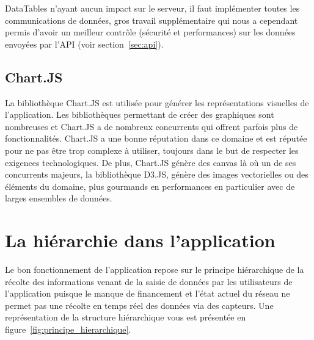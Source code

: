 \documentclass{EPL-master-thesis-covers-FR}
\begin{document}
				DataTables n'ayant aucun impact sur le serveur, il faut implémenter toutes les communications de données, gros travail supplémentaire qui nous a cependant permis d'avoir un meilleur contrôle (sécurité et performances) sur les données envoyées par l'API (voir section~\ref{sec:api}).


			\subsection*{Chart.JS}

				La bibliothèque Chart.JS est utilisée pour générer les représentations visuelles de l'application. Les bibliothèques permettant de créer des graphiques sont nombreuses et Chart.JS a de nombreux concurrents qui offrent parfois plus de fonctionnalités. Chart.JS a une bonne réputation dans ce domaine et est réputée pour ne pas être trop complexe à utiliser, toujours dans le but de respecter les exigences technologiques.
				De plus, Chart.JS génère des canvas là où un de ses concurrents majeurs, la bibliothèque D3.JS, génère des images vectorielles ou des éléments du domaine, plus gourmands en performances en particulier avec de larges ensembles de données.

		\section{La hiérarchie dans l'application}

			Le bon fonctionnement de l'application repose sur le principe hiérarchique de la récolte des informations venant de la saisie de données par les utilisateurs de l'application puisque le manque de financement et l'état actuel du réseau ne permet pas une récolte en temps réel des données via des capteurs. Une représentation de la structure hiérarchique vous est présentée en figure~\ref{fig:principe_hierarchique}.
\end{document}
